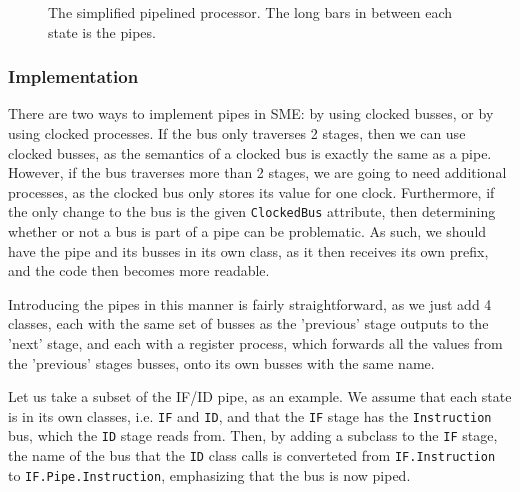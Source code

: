 \begin{figure}
{
    }
    \caption{The simplified pipelined processor. The long bars in between each
    state is the pipes.}
    \label{fig:pipes}
\end{figure}

\subsubsection*{Implementation}
There are two ways to implement pipes in SME: by using clocked busses, or by
using clocked processes. If the bus only traverses 2 stages, then we can use
clocked busses, as the semantics of a clocked bus is exactly the same as a
pipe. However, if the bus traverses more than 2 stages, we are going to need
additional processes, as the clocked bus only stores its value for one clock.
Furthermore, if the only change to the bus is the given \texttt{ClockedBus}
attribute, then determining whether or not a bus is part of a pipe can be
problematic. As such, we should have the pipe and its busses in its own class,
as it then receives its own prefix, and the code then becomes more readable.

Introducing the pipes in this manner is fairly straightforward, as we just
add 4 classes, each with the same set of busses as the 'previous' stage outputs
to the 'next' stage, and each with a register process, which forwards all the
values from the 'previous' stages busses, onto its own busses with the same
name.

Let us take a subset of the IF/ID pipe, as an example. We assume that each
state is in its own classes, i.e. \texttt{IF} and \texttt{ID}, and that the
\texttt{IF} stage has the \texttt{Instruction} bus, which the \texttt{ID} stage
reads from. Then, by adding a subclass to the \texttt{IF} stage, the name of
the bus that the \texttt{ID} class calls is converteted from
\texttt{IF.Instruction} to \texttt{IF.Pipe.Instruction}, emphasizing that the
bus is now piped.

